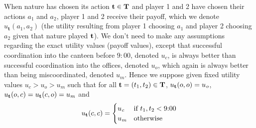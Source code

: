 \documentclass[twocolumn,a4paper,superscriptaddress,nofootinbib]{revtex4}
\begin{document}
When nature has chosen its action ${\bf t} \in \bf T$ and player 1 and 2 have chosen their actions $a_1$ and $a_2$, player 1 and 2 receive their payoff, which we denote $u_\mathbf{t}(a_1,a_2)$ (the utility resulting from player 1 choosing $a_1$ and player 2 choosing $a_2$ given that nature played $\bf t$). We don't need to make any assumptions regarding the exact utility values (payoff values), except that successful coordination into the canteen before $9{:}00$, denoted $u_\mathit{c}$, is always better than successful coordination into the offices, denoted $u_\mathit{o}$, which again is always better than being miscoordinated, denoted $u_\mathit{m}$. Hence we suppose given fixed utility values $u_\mathit{c} > u_\mathit{o} > u_\mathit{m}$ such that for all ${\bf t} = (t_1,t_2) \in {\bf T}$,  $u_{\bf t}(o,o) = u_\mathit{o}$, $u_{\bf t}(o,c) = u_{\bf t}(c,o) = u_\mathit{m}$ and 
\[
u_{\bf t}(c,c) = 
\begin{cases}
   u_\mathit{c} &\text{if $t_1,t_2 < 9{:}00$} \\
   u_\mathit{m} &\text{otherwise}
\end{cases}
\]
\end{document}
